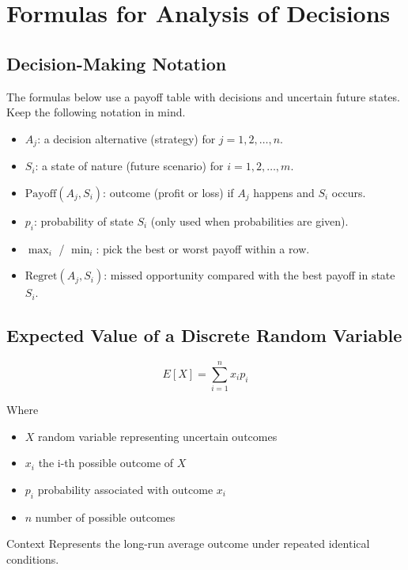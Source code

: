 \section{Formulas for Analysis of Decisions}\label{formulas-section}

\subsection{Decision-Making Notation}\label{formula-notation}

The formulas below use a payoff table with decisions and uncertain future states. Keep the following notation in mind.

\begin{itemize}
	\item \(A_j\): a decision alternative (strategy) for \(j = 1, 2, \dots, n\).
	\item \(S_i\): a state of nature (future scenario) for \(i = 1, 2, \dots, m\).
	\item \(\text{Payoff}(A_j,S_i)\): outcome (profit or loss) if \(A_j\) happens and \(S_i\) occurs.
	\item \(p_i\): probability of state \(S_i\) (only used when probabilities are given).
	\item \(\max_i\) / \(\min_i\): pick the best or worst payoff within a row.
	\item \(\text{Regret}(A_j,S_i)\): missed opportunity compared with the best payoff in state \(S_i\).
\end{itemize}
	
	\subsection{Expected Value of a Discrete Random Variable}\label{formula-expected-value}
	
	\[
	E[X] = \sum_{i=1}^{n} x_i p_i
	\]
	
	Where
	\begin{itemize}
		\item \(X\) random variable representing uncertain outcomes
		\item \(x_i\) the i-th possible outcome of \(X\)
		\item \(p_i\) probability associated with outcome \(x_i\)
		\item \(n\) number of possible outcomes
	\end{itemize}
	
	Context
	Represents the long-run average outcome under repeated identical conditions.
	
